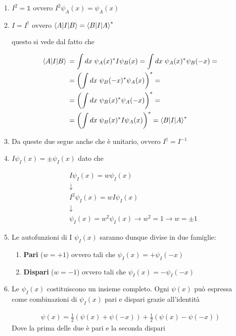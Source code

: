 \begin{enumerate}
	\item $I^2= \mathbb{1}$ ovvero $I^2\psi_A(x)= \psi_A(x)$
	
	\item $I=I^\dagger$ ovvero $\braket{A|I|B}= \braket{B|I|A}^*$
	
		questo si vede dal fatto che
		
		\begin{align}
		\braket{A|I|B} {}&= \int dx \; \psi_A(x)^* I \psi_B(x) = \int dx \; \psi_A(x)^* \psi_B(-x) = \nonumber \\
		&= \left(\int dx \; \psi_B(-x)^* \psi_A(x) \right)^* = \nonumber \\
		&= \left(\int dx \; \psi_B(x)^* \psi_A(-x) \right)^* = \nonumber \\
		&= \left(\int dx \; \psi_B(x)^* I \psi_A(x)\right)^* = \braket{B|I|A}^*
		\end{align}
		
	\item Da queste due segue anche che è unitario, ovvero $I^\dagger = I^{-1}$
	
	\item $I\psi_I(x)= \pm \psi_I(x)$ dato che
	
		\begin{align}
		{}&I\psi_I(x) = w \psi_I(x) \nonumber \\
		&\downarrow \nonumber \\
		&I^2\psi_I(x) = w I\psi_I(x) \nonumber \\
		&\downarrow \nonumber \\
		&\psi_I(x) = w^2\psi_I(x) \rightarrow w^2=1 \rightarrow w= \pm 1
		\end{align}
	
	\item Le autofunzioni di I $\psi_I(x)$ saranno dunque divise in due famiglie:
	
		\begin{enumerate}
		\item \textbf{Pari} ($w=+1$) ovvero tali che $\psi_I(x)=+\psi_I(-x)$
		\item \textbf{Dispari} ($w=-1$) ovvero tali che $\psi_I(x)=-\psi_I(-x)$
		\end{enumerate}
	
	\item Le $\psi_I(x)$ costituiscono un insieme completo. Ogni $\psi(x)$ può espressa come combinazioni di $\psi_I(x)$ pari e dispari grazie all'identità
	
	\begin{align}
	\psi(x)= \frac{1}{2}(\psi(x) + \psi(-x)) + \frac{1}{2}(\psi(x) - \psi(-x))
	\end{align}
	Dove la prima delle due è pari e la seconda dispari
	

\end{enumerate}
